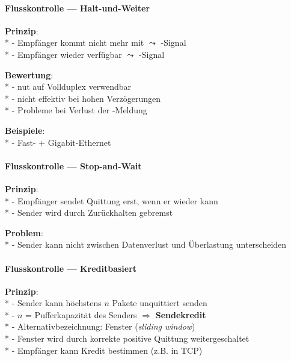 \paragraph{Flusskontrolle --- Halt-und-Weiter}
\begin{items}
  \item \textbf{Prinzip}: \\*
    - Empfänger kommt nicht mehr mit \( \leadsto \) -Signal \\*
    - Empfänger wieder verfügbar \( \leadsto \) -Signal
  \item \textbf{Bewertung}: \\*
    - nut auf Vollduplex verwendbar \\*
    - nicht effektiv bei hohen Verzögerungen \\*
    - Probleme bei Verlust der -Meldung
  \item \textbf{Beispiele}: \\*
    - Fast- + Gigabit-Ethernet
\end{items}

\paragraph{Flusskontrolle --- Stop-and-Wait}
\begin{items}
  \item \textbf{Prinzip}: \\*
    - Empfänger sendet Quittung erst, wenn er wieder kann \\*
    - Sender wird durch Zurückhalten gebremst
  \item \textbf{Problem}: \\*
    - Sender kann nicht zwischen Datenverlust und Überlastung unterscheiden
\end{items}

\paragraph{Flusskontrolle --- Kreditbasiert}
\begin{items}
  \item \textbf{Prinzip}: \\*
    - Sender kann höchstens \( n \) Pakete unquittiert senden \\*
    - \( n \) = Pufferkapazität des Senders \( \Rightarrow \) \textbf{Sendekredit} \\*
    - Alternativbezeichnung: Fenster (\emph{sliding window}) \\*
    - Fenster wird durch korrekte positive Quittung weitergeschaltet \\*
    - Empfänger kann Kredit bestimmen (z.B. in TCP)
\end{items}


